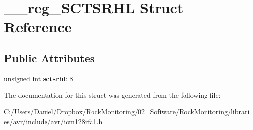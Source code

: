 \hypertarget{struct____reg___s_c_t_s_r_h_l}{}\section{\+\_\+\+\_\+reg\+\_\+\+S\+C\+T\+S\+R\+HL Struct Reference}
\label{struct____reg___s_c_t_s_r_h_l}
\subsection*{Public Attributes}
\begin{DoxyCompactItemize}
\item 
unsigned int {\bfseries sctsrhl}\+: 8\hypertarget{struct____reg___s_c_t_s_r_h_l_ad6b6c9a25b7c17b2f648d470f94f03b9}{}\label{struct____reg___s_c_t_s_r_h_l_ad6b6c9a25b7c17b2f648d470f94f03b9}

\end{DoxyCompactItemize}


The documentation for this struct was generated from the following file\+:\begin{DoxyCompactItemize}
\item 
C\+:/\+Users/\+Daniel/\+Dropbox/\+Rock\+Monitoring/02\+\_\+\+Software/\+Rock\+Monitoring/libraries/avr/include/avr/iom128rfa1.\+h\end{DoxyCompactItemize}
